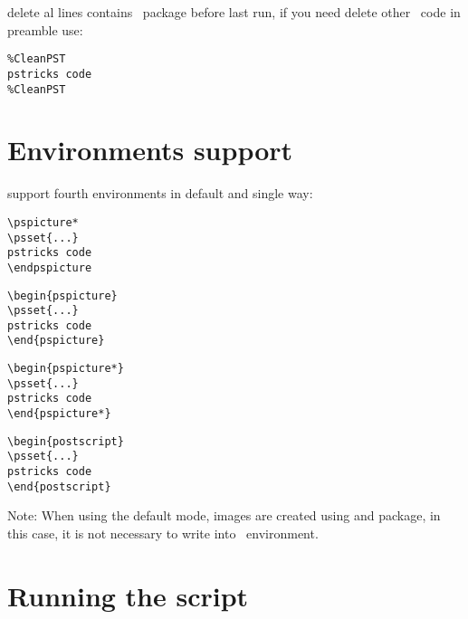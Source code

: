 \documentclass[11pt,english,BCOR=10mm,DIV=12,bibliography=totoc,parskip=false,headings=small,
    headinclude=false,footinclude=false,twoside]{pst-doc}
\begin{document}
 delete al lines contains \PST\ package before last run, if you need delete other \PST\ code in preamble use:

\begin{verbatim}
%CleanPST
pstricks code	
%CleanPST
\end{verbatim}

\section{Environments support}
 support fourth environments in default and single way:

\vspace{10pt}
\begin{minipage}[c]{0.25\textwidth}
\begin{verbatim}
\pspicture*
\psset{...}
pstricks code	
\endpspicture
\end{verbatim}
\end{minipage}
\begin{minipage}[c]{0.25\textwidth}
\begin{verbatim}
\begin{pspicture}
\psset{...}
pstricks code	
\end{pspicture}
\end{verbatim}
\end{minipage}
\begin{minipage}[c]{0.25\textwidth}
\begin{verbatim}
\begin{pspicture*}
\psset{...}
pstricks code	
\end{pspicture*}
\end{verbatim}
\end{minipage}
\begin{minipage}[c]{0.25\textwidth}
\begin{verbatim}
\begin{postscript}
\psset{...}
pstricks code	
\end{postscript}
\end{verbatim}
\end{minipage}

\vspace{10pt}
Note: When using the default mode, images are created using  and  package, in this case, it is not necessary 
to write  into \PST\ environment.
\newpage
\section{Running the script}
\end{document}
